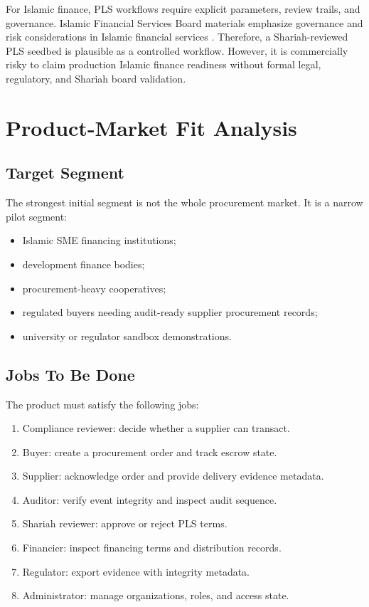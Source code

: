 \documentclass[conference]{IEEEtran}
\begin{document}
For Islamic finance, PLS workflows require explicit parameters, review trails, and governance. Islamic Financial Services Board materials emphasize governance and risk considerations in Islamic financial services \cite{IFSB}. Therefore, a Shariah-reviewed PLS seedbed is plausible as a controlled workflow. However, it is commercially risky to claim production Islamic finance readiness without formal legal, regulatory, and Shariah board validation.

\section{Product-Market Fit Analysis}

\subsection{Target Segment}
The strongest initial segment is not the whole procurement market. It is a narrow pilot segment:

\begin{itemize}
    \item Islamic SME financing institutions;
    \item development finance bodies;
    \item procurement-heavy cooperatives;
    \item regulated buyers needing audit-ready supplier procurement records;
    \item university or regulator sandbox demonstrations.
\end{itemize}

\subsection{Jobs To Be Done}
The product must satisfy the following jobs:

\begin{enumerate}
    \item Compliance reviewer: decide whether a supplier can transact.
    \item Buyer: create a procurement order and track escrow state.
    \item Supplier: acknowledge order and provide delivery evidence metadata.
    \item Auditor: verify event integrity and inspect audit sequence.
    \item Shariah reviewer: approve or reject PLS terms.
    \item Financier: inspect financing terms and distribution records.
    \item Regulator: export evidence with integrity metadata.
    \item Administrator: manage organizations, roles, and access state.
\end{enumerate}
\end{document}
